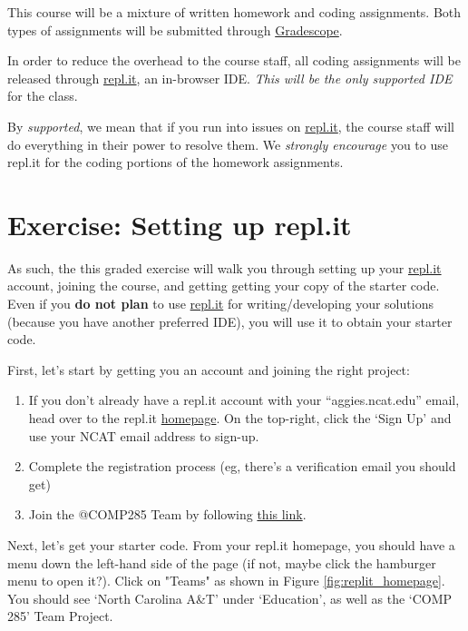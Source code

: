 \documentclass [12pt]{article}
\begin{document}
This course will be a mixture of written homework and coding assignments. Both types of assignments will be submitted through \href{https://www.gradescope.com/courses/350304}{Gradescope}.

In order to reduce the overhead to the course staff, all coding assignments will be released through \href{https://repl.it/}{repl.it}, an in-browser IDE. \textit{This will be the only supported IDE} for the class.

By \textit{supported}, we mean that if you run into issues on \href{https://repl.it/}{repl.it}, the course staff will do everything in their power to resolve them. We \textit{strongly encourage} you to use repl.it for the coding portions of the homework assignments.


\section {Exercise: Setting up repl.it}
 As such, the this graded exercise will walk you through setting up your \href{https://repl.it/}{repl.it} account, joining the course, and getting getting your copy of the starter code. Even if you \textbf{do not plan} to use \href{https://repl.it/}{repl.it} for writing/developing your solutions (because you have another preferred IDE), you will use it to obtain your starter code. 

First, let's start by getting you an account and joining the right project:

\begin{enumerate}
    \item If you don't already have a repl.it account with your ``aggies.ncat.edu'' email, head over to the repl.it \href{https://repl.it/}{homepage}. On the top-right, click the `Sign Up' and use your NCAT email address to sign-up.
    \item Complete the registration process (eg, there's a verification email you should get)
    \item Join the @COMP285 Team by following \href{https://repl.it/teams/join/axywewyfiltmqtcgovikrywbqisfdgss-COMP285}{this link}.
\end{enumerate}

Next, let's get your starter code. From your repl.it homepage, you should have a menu down the left-hand side of the page (if not, maybe click the hamburger menu to open it?). Click on "Teams" as shown in Figure \ref{fig:replit_homepage}. You should see `North Carolina A\&T' under `Education', as well as the `COMP 285' Team Project.
\end{document}
